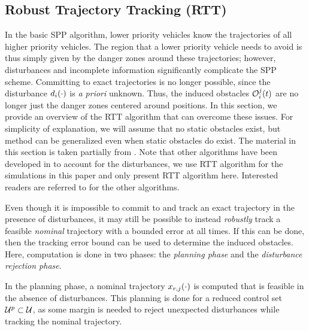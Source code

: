 \subsection{Robust Trajectory Tracking (RTT) \label{sec:rtt}}
In the basic SPP algorithm, lower priority vehicles know the trajectories of all higher priority vehicles. The region that a lower priority vehicle needs to avoid is thus simply given by the danger zones around these trajectories; however, disturbances and incomplete information significantly complicate the SPP scheme. Committing to exact trajectories is no longer possible, since the disturbance $d_i(\cdot)$ is \textit{a priori} unknown. Thus, the induced obstacles $\mathcal{O}_i^j(t)$ are no longer just the danger zones centered around positions. In this section, we provide an overview of the RTT algorithm that can overcome these issues. For simplicity of explanation, we will assume that no static obstacles exist, but method can be generalized even when static obstacles do exist. The material in this section is taken partially from \cite{Bansal2017}. Note that other algorithms have been developed in \cite{Bansal2017} to account for the disturbances, we use RTT algorithm for the simulations in this paper and only present RTT algorithm here. Interested readers are referred to \cite{Bansal2017} for the other algorithms. 

Even though it is impossible to commit to and track an exact trajectory in the presence of disturbances, it may still be possible to instead \textit{robustly} track a feasible \textit{nominal} trajectory with a bounded error at all times. If this can be done, then the tracking error bound can be used to determine the induced obstacles. Here, computation is done in two phases: the \textit{planning phase} and the \textit{disturbance rejection phase}. 

In the planning phase, a nominal trajectory $x_{r,j}(\cdot)$ is computed that is feasible in the absence of disturbances. This planning is done for a reduced control set $\mathcal{U}^p\subset\mathcal{U}$, as some margin is needed to reject unexpected disturbances while tracking the nominal trajectory.



